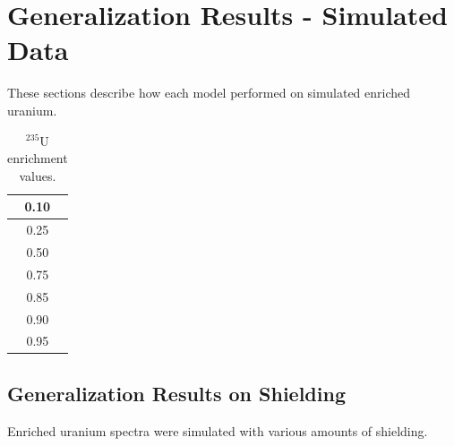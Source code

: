 \section{Generalization Results - Simulated Data}

These sections describe how each model performed on simulated enriched uranium.


\begin{table}[H]
\centering
\label{table:generalization_enrichment_values}
\caption{$^{235}$U enrichment values.}
\begin{tabular}{c}
\hline
0.10 \\ \hline
0.25 \\ \hline
0.50 \\ \hline
0.75 \\ \hline
0.85 \\ \hline
0.90 \\ \hline
0.95 \\ \hline
\end{tabular}
\end{table}


\subsection{Generalization Results on Shielding}

Enriched uranium spectra were simulated with various amounts of shielding.



